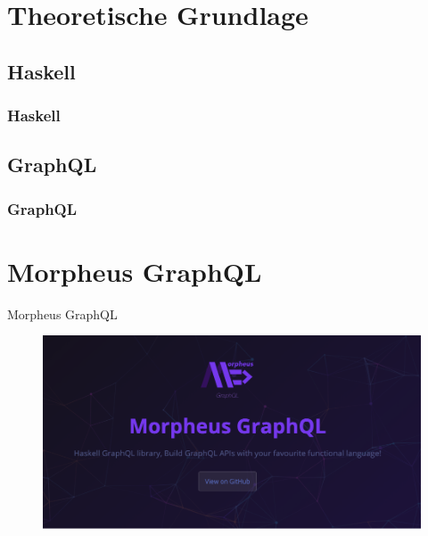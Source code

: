 
\section{Theoretische Grundlage}

\subsection{Haskell}
\begin{frame}{}
    \frametitle{Haskell}
\end{frame}


\subsection{GraphQL}
\begin{frame}{}
    \frametitle{GraphQL}
\end{frame}


\section{Morpheus GraphQL}
\begin{frame}{Morpheus GraphQL}
    \begin{figure}
        \centering
        \includegraphics[width=1.1\textwidth]{assets/img/morpheus-graphql-bg.png}
    \end{figure}
\end{frame}